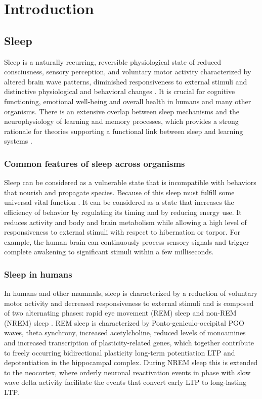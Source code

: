 \graphicspath{{chapters/02/images}}
\chapter{Introduction}

\section{Sleep}
Sleep is a naturally recurring, reversible physiological state of reduced consciusness, sensory perception, and voluntary motor activity characterized by altered brain wave patterns, diminished responsiveness to external stimuli and distinctive physiological and behavioral changes \cite{sleep}.
It is crucial for cognitive functioning, emotional well-being and overall health in humans and many other organisms.
There is an extensive overlap between sleep mechanisms and the neurophysiology of learning and memory processes, which provides a strong rationale for theories supporting a functional link between sleep and learning systems \cite{sleep-cognitive}.

  \subsection{Common features of sleep across organisms}
  Sleep can be considered as a vulnerable state that is incompatible with behaviors that nourish and propagate species.
  Because of this sleep must fulfill some universal vital function \cite{sleep-across-species}.
  It can be considered as a state that increases the efficiency of behavior by regulating its timing and by reducing energy use.
  It reduces activity and body and brain metabolism while allowing a high level of responsiveness to external stimuli with respect to hibernation or torpor.
  For example, the human brain can continuously process sensory signals and trigger complete awakening to significant stimuli within a few milliseconds.

  \subsection{Sleep in humans}
  In humans and other mammals, sleep is characterized by a reduction of voluntary motor activity and decreased responsiveness to external stimuli and is composed of two alternating phases: rapid eye movement (REM) sleep and non-REM (NREM) sleep \cite{cognitive-neuroscience-of-sleep}.
  REM sleep is characterized by Ponto-geniculo-occipital PGO waves, theta synchrony, increased acetylcholine, reduced levels of monoamines and increased transcription of plasticity-related genes, which together contribute to freely occurring bidirectional plasticity long-term potentiation LTP and depotentiation in the hippocampal complex.
  During NREM sleep this is extended to the neocortex, where orderly neuronal reactivation events in phase with slow wave delta activity facilitate the events that convert early LTP to long-lasting LTP.\\

